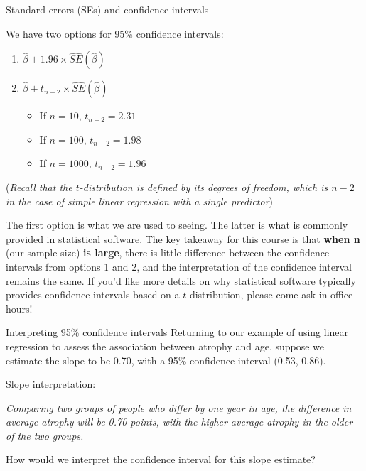 \documentclass[10pt,t]{beamer}
\begin{document}
\begin{frame}{Standard errors (SEs) and confidence intervals}

We have two options for 95\% confidence intervals:
\begin{enumerate}
	\item $\hat{\beta} \pm 1.96 \times \hat{SE}(\hat{\beta})$
	\item $\hat{\beta} \pm t_{n-2} \times \hat{SE}(\hat{\beta})$
	\begin{itemize}
		\item If $n = 10$, $t_{n-2} = 2.31$
		\item If $n = 100$, $t_{n-2} = 1.98$
		\item If $n = 1000$, $t_{n-2} = 1.96$
	\end{itemize}
\end{enumerate}

\small (\textit{Recall that the $t$-distribution is defined by its \textit{degrees of freedom}, which is $n-2$ in the case of simple linear regression with a single predictor})

\vspace{0.3cm}

\normalsize The first option is what we are used to seeing. The latter is what is commonly provided in statistical software. The key takeaway for this course is that \textbf{when n} (our sample size) \textbf{is large}, there is little difference between the confidence intervals from options 1 and 2, and the interpretation of the confidence interval remains the same. If you'd like more details on why statistical software typically provides confidence intervals based on a $t$-distribution, please come ask in office hours!

\end{frame}

\begin{frame}{Interpreting 95\% confidence intervals}
Returning to our example of using linear regression to assess the association between atrophy and age, suppose we estimate the slope to be 0.70, with a 95\% confidence interval (0.53, 0.86).

\vspace{0.3cm}

Slope interpretation:

\vspace{0.3cm}

\textit{Comparing two groups of people who differ by one year in age, the difference in average atrophy will be 0.70 points, with the higher average atrophy in the older of the two groups.}

\vspace{0.3cm}

How would we interpret the confidence interval for this slope estimate? %

\end{frame}
\end{document}
